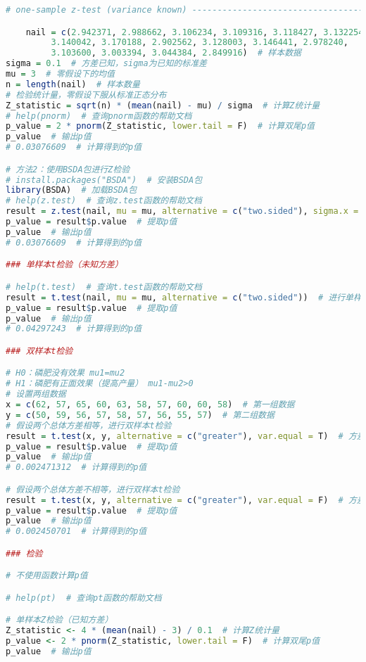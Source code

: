 \documentclass[UTF8]{report}
\theoremstyle{MyLineTheoremStyle} %
\theoremstyle{MyBlockTheoremStyle} %
\theoremstyle{MySubsubsectionStyle} %
\begin{document}
\begin{lstlisting}[language=R]
 # one-sample z-test (variance known) ---------------------------------------------

    nail = c(2.942371, 2.988662, 3.106234, 3.109316, 3.118427, 3.132254, 
         3.140042, 3.170188, 2.902562, 3.128003, 3.146441, 2.978240, 
         3.103600, 3.003394, 3.044384, 2.849916)  # 样本数据
sigma = 0.1  # 方差已知，sigma为已知的标准差
mu = 3  # 零假设下的均值
n = length(nail)  # 样本数量
# 检验统计量，零假设下服从标准正态分布
Z_statistic = sqrt(n) * (mean(nail) - mu) / sigma  # 计算Z统计量
# help(pnorm)  # 查询pnorm函数的帮助文档
p_value = 2 * pnorm(Z_statistic, lower.tail = F)  # 计算双尾p值
p_value  # 输出p值
# 0.03076609  # 计算得到的p值

# 方法2：使用BSDA包进行Z检验
# install.packages("BSDA")  # 安装BSDA包
library(BSDA)  # 加载BSDA包
# help(z.test)  # 查询z.test函数的帮助文档
result = z.test(nail, mu = mu, alternative = c("two.sided"), sigma.x = sigma)  # 使用z.test进行Z检验
p_value = result$p.value  # 提取p值
p_value  # 输出p值
# 0.03076609  # 计算得到的p值

### 单样本t检验（未知方差）

# help(t.test)  # 查询t.test函数的帮助文档
result = t.test(nail, mu = mu, alternative = c("two.sided"))  # 进行单样本t检验
p_value = result$p.value  # 提取p值
p_value  # 输出p值
# 0.04297243  # 计算得到的p值

### 双样本t检验

# H0：磷肥没有效果 mu1=mu2
# H1：磷肥有正面效果（提高产量） mu1-mu2>0
# 设置两组数据
x = c(62, 57, 65, 60, 63, 58, 57, 60, 60, 58)  # 第一组数据
y = c(50, 59, 56, 57, 58, 57, 56, 55, 57)  # 第二组数据
# 假设两个总体方差相等，进行双样本t检验
result = t.test(x, y, alternative = c("greater"), var.equal = T)  # 方差相等假设
p_value = result$p.value  # 提取p值
p_value  # 输出p值
# 0.002471312  # 计算得到的p值

# 假设两个总体方差不相等，进行双样本t检验
result = t.test(x, y, alternative = c("greater"), var.equal = F)  # 方差不等假设
p_value = result$p.value  # 提取p值
p_value  # 输出p值
# 0.002450701  # 计算得到的p值

### 检验

# 不使用函数计算p值

# help(pt)  # 查询pt函数的帮助文档

# 单样本Z检验（已知方差）
Z_statistic <- 4 * (mean(nail) - 3) / 0.1  # 计算Z统计量
p_value <- 2 * pnorm(Z_statistic, lower.tail = F)  # 计算双尾p值
p_value  # 输出p值


\end{lstlisting}
\end{document}
